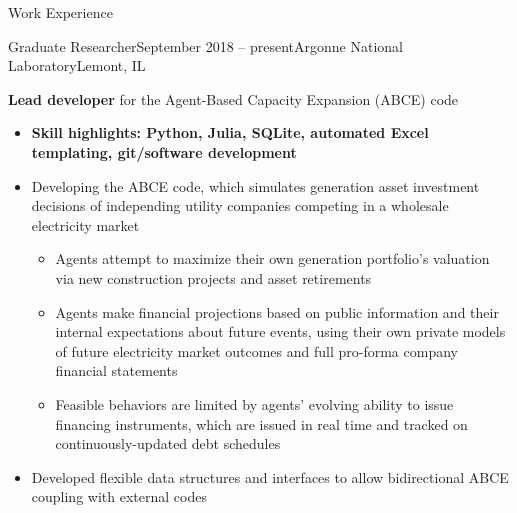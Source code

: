 \documentclass{resume} %
\begin{document}

\begin{rSection}{Work Experience}

\begin{rSubsection}{Graduate Researcher}{September 2018 -- present}{Argonne National Laboratory}{Lemont, IL}
  \item \textbf{Lead developer} for the Agent-Based Capacity Expansion (ABCE) code
    \begin{itemize}
      \setlength{\itemsep}{-3pt}
      \item \textbf{Skill highlights: Python, Julia, SQLite, automated Excel templating, git/software development}
      \item Developing the ABCE code, which simulates generation asset investment decisions of independing utility companies competing in a wholesale electricity market
        \begin{itemize}
          \item Agents attempt to maximize their own generation portfolio's valuation via new construction projects and asset retirements
          \item Agents make financial projections based on public information and their internal expectations about future events, using their own private models of future electricity market outcomes and full pro-forma company financial statements
          \item Feasible behaviors are limited by agents' evolving ability to issue financing instruments, which are issued in real time and tracked on continuously-updated debt schedules
        \end{itemize}
      \item Developed flexible data structures and interfaces to allow bidirectional ABCE coupling with external codes
    \end{itemize}


\end{rSubsection}
\end{rSection}
\end{document}
